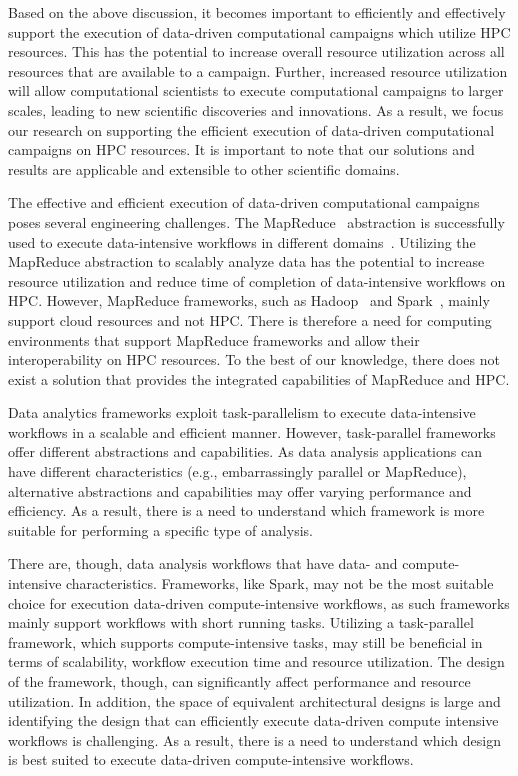 Based on the above discussion, it becomes important to efficiently and 
effectively support the execution of data-driven computational campaigns which 
utilize HPC resources. This has the potential to increase overall resource 
utilization across all resources that are available to a campaign. Further, 
increased resource utilization will allow computational scientists to execute 
computational campaigns to larger scales, leading to new scientific discoveries 
and innovations. As a result, we focus our research on supporting the efficient 
execution of data-driven computational campaigns on HPC resources. It is 
important to note that our solutions and results are applicable and extensible 
to other scientific domains.

The effective and efficient execution of data-driven computational campaigns 
poses several engineering challenges. The MapReduce~\cite{dean2004mapreduce} 
abstraction is successfully used to execute data-intensive workflows in 
different domains~\cite{hellerstein2012science}. Utilizing the MapReduce 
abstraction to scalably analyze data has the potential to increase resource 
utilization and reduce time of completion of data-intensive workflows on HPC. 
However, MapReduce frameworks, such as Hadoop~\cite{hadoop} and 
Spark~\cite{zaharia2010spark}, mainly support cloud resources and not HPC. 
There is therefore a need for computing environments that support MapReduce 
frameworks and allow their interoperability on HPC resources. To the best of 
our knowledge, there does not exist a solution that provides the integrated 
capabilities of MapReduce and HPC.

Data analytics frameworks exploit task-parallelism to execute data-intensive 
workflows in a scalable and efficient manner. However, task-parallel frameworks 
offer different abstractions and capabilities. As data analysis applications 
can have different characteristics (e.g., embarrassingly parallel or 
MapReduce), alternative abstractions and capabilities may offer varying 
performance and efficiency. As a result, there is a need to understand which 
framework is more suitable for performing a specific type of analysis.

There are, though, data analysis workflows that have data- and 
compute-intensive characteristics. Frameworks, like Spark, may not be the most 
suitable choice for execution data-driven compute-intensive workflows, as such 
frameworks mainly support workflows with short running tasks. Utilizing a 
task-parallel framework, which supports compute-intensive tasks, may still be 
beneficial in terms of scalability, workflow execution time and resource 
utilization. The design of the framework, though, can significantly affect 
performance and resource utilization. In addition, the space of equivalent 
architectural designs is large and identifying the design that can efficiently 
execute data-driven compute intensive workflows is challenging. As a result, 
there is a need to understand which design is best suited to execute 
data-driven compute-intensive workflows.

